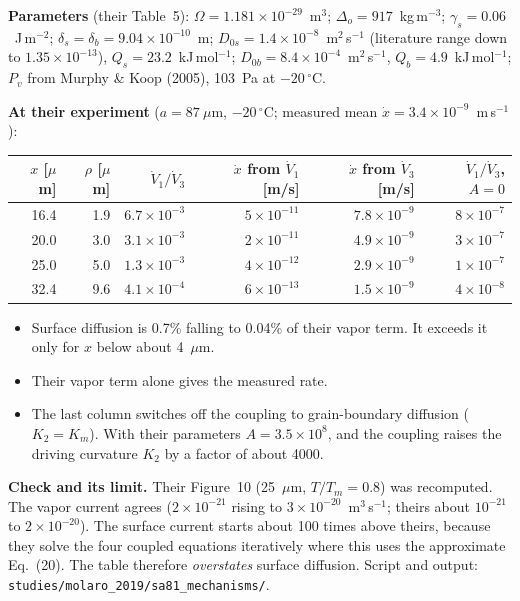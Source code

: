 \documentclass[11pt]{article}
\begin{document}
\textbf{Parameters} (their Table~5): $\Omega = 1.181\times10^{-29}$~m$^{3}$;
$\Delta_o = 917$~kg\,m$^{-3}$; $\gamma_s = 0.06$~J\,m$^{-2}$; $\delta_s =
\delta_b = 9.04\times10^{-10}$~m; $D_{0s} = 1.4\times10^{-8}$~m$^{2}$\,s$^{-1}$
(literature range down to $1.35\times10^{-13}$), $Q_s = 23.2$~kJ\,mol$^{-1}$;
$D_{0b} = 8.4\times10^{-4}$~m$^{2}$\,s$^{-1}$, $Q_b = 4.9$~kJ\,mol$^{-1}$;
$P_v$ from Murphy \& Koop (2005), 103~Pa at $-20\,^{\circ}$C.

\textbf{At their experiment} ($a = 87~\mu$m, $-20\,^{\circ}$C; measured mean
$\dot x = 3.4\times10^{-9}$~m\,s$^{-1}$):
\begin{center}\small\begin{tabular}{rrrrrr}\toprule
$x$ [$\mu$m] & $\rho$ [$\mu$m] & $\dot V_1/\dot V_3$ & $\dot x$ from $\dot V_1$ [m/s] & $\dot x$ from $\dot V_3$ [m/s] & $\dot V_1/\dot V_3$, $A = 0$\\\midrule
16.4 & 1.9 & $6.7\times10^{-3}$ & $5\times10^{-11}$ & $7.8\times10^{-9}$ & $8\times10^{-7}$\\
20.0 & 3.0 & $3.1\times10^{-3}$ & $2\times10^{-11}$ & $4.9\times10^{-9}$ & $3\times10^{-7}$\\
25.0 & 5.0 & $1.3\times10^{-3}$ & $4\times10^{-12}$ & $2.9\times10^{-9}$ & $1\times10^{-7}$\\
32.4 & 9.6 & $4.1\times10^{-4}$ & $6\times10^{-13}$ & $1.5\times10^{-9}$ & $4\times10^{-8}$\\\bottomrule
\end{tabular}\end{center}
\begin{itemize}
\item Surface diffusion is 0.7\% falling to 0.04\% of their vapor term. It
  exceeds it only for $x$ below about 4~$\mu$m.
\item Their vapor term alone gives the measured rate.
\item The last column switches off the coupling to grain-boundary diffusion
  ($K_2 = K_m$). With their parameters $A = 3.5\times10^{8}$, and the
  coupling raises the driving curvature $K_2$ by a factor of about 4000.
\end{itemize}
\textbf{Check and its limit.} Their Figure~10 (25~$\mu$m, $T/T_m = 0.8$) was
recomputed. The vapor current agrees ($2\times10^{-21}$ rising to
$3\times10^{-20}$~m$^{3}$\,s$^{-1}$; theirs about $10^{-21}$ to
$2\times10^{-20}$). The surface current starts about 100 times above theirs,
because they solve the four coupled equations iteratively where this uses
the approximate Eq.~(20). The table therefore \emph{overstates} surface
diffusion. Script and output:
\texttt{studies/molaro\_2019/sa81\_mechanisms/}.
\end{document}
